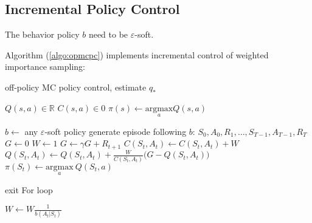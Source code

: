 \subsection{Incremental Policy Control}

The behavior policy $b$ need to be $\varepsilon$-soft.

Algorithm (\ref{algo:opmcpc}) implements incremental control of weighted importance sampling:

\begin{algorithm}
	\caption{off-policy MC policy control, estimate $q_*$}\label{algo:opmcpc}	
	
	\begin{algorithmic}[1]
		\State $Q(s,a) \in \mathbb{R}$
		\State $C(s,a) \in 0$
		\State $\pi(s) \gets \underset{a}{\text{argmax}} Q(s,a)$
		
		\Statex
		
		\Loop
			\State $b \gets $ any $\varepsilon$-soft policy
			\State generate episode following $b$: $S_0, A_0,R_1, \dots, S_{T-1},A_{T-1},R_T$
			\State $G \gets 0$
			\State $W \gets 1$
				\State $G \gets \gamma G + R_{t+1}$
				\State $C(S_t,A_t) \gets C(S_t,A_t) + W$ 
				\State $\displaystyle Q(S_t,A_t) \gets Q(S_t,A_t) + \frac{W}{C(S_t,A_t)} \Big( G - Q(S_t,A_t) \Big)$
				\State $\pi(S_t) \gets \underset{a}{\text{argmax}}\  Q(S_t,a)$
				
					\State exit  For loop
				\EndIf
				
				\State $\displaystyle W \gets W \frac{1}{b(A_t|S_t)}$ 
			\EndFor
		\EndLoop
	\end{algorithmic}
\end{algorithm}



